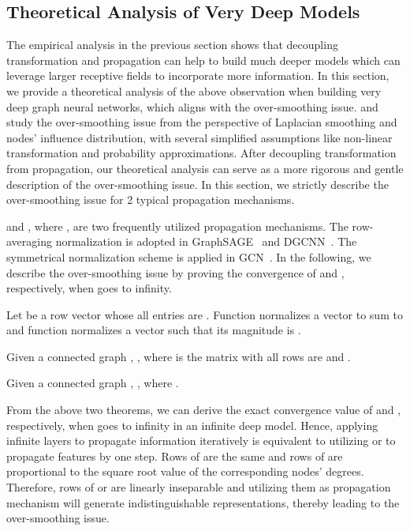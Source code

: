 \documentclass[sigconf]{acmart}
\begin{document}
\subsection{Theoretical Analysis of Very Deep Models}\label{Sec:TH}

The empirical analysis in the previous section shows that
decoupling transformation and propagation can help to build much
deeper models which can leverage larger receptive fields to incorporate more information. In this
section, we provide a theoretical analysis of the above observation when building very deep graph neural networks, which aligns with the over-smoothing issue.
\cite{li2018deeper} and ~\cite{xu2018representation} study the
over-smoothing issue from the perspective of Laplacian smoothing
and nodes' influence distribution, with several simplified
assumptions like non-linear transformation and probability
approximations. After decoupling transformation from propagation, our theoretical analysis can serve as a more
rigorous and gentle description of the over-smoothing issue. In
this section, we strictly describe the over-smoothing issue for 2
typical propagation mechanisms.


and
,
where ,
are two frequently utilized propagation mechanisms. The
row-averaging normalization  is
adopted in GraphSAGE~\cite{hamilton2017inductive} and
DGCNN~\cite{zhang2018end}. The symmetrical normalization scheme
 is applied in
GCN~\cite{kipf2016semi}. In the following, we describe the
over-smoothing issue by proving the convergence of
 and
, respectively, when  goes
to infinity.

Let 
be a row vector whose all entries are . Function
 normalizes a vector to sum to  and
function  normalizes a vector such that its
magnitude is .

\begin{theorem}
\label{TH1}
Given a connected graph , ,
where  is the matrix with all rows
are  and
.
\end{theorem}


\begin{theorem}
\label{TH2}
Given a connected graph , ,
where
.
\end{theorem}

From the above two theorems, we can derive the exact convergence
value of  and
, respectively, when  goes
to infinity in an infinite deep model. Hence, applying infinite
layers to propagate information iteratively is equivalent to
utilizing  or 
to propagate features by one step. Rows of
 are the same and rows of
 are proportional to the square root
value of the corresponding nodes' degrees. Therefore, rows of
 or  are
linearly inseparable and utilizing them as propagation mechanism
will generate indistinguishable representations, thereby leading
to the over-smoothing issue.
\end{document}
